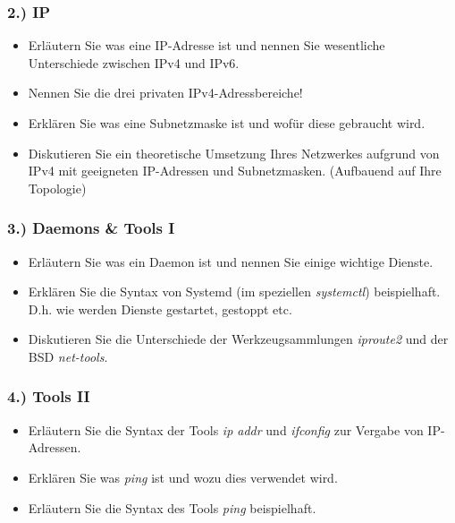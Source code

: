 \documentclass[xcolor=dvipsnames, aspectratio=169]{beamer}
\begin{document}
\begin{frame}
\frametitle{2.) IP}
	\begin{itemize}
		\item Erläutern Sie was eine IP-Adresse ist und nennen Sie wesentliche Unterschiede zwischen IPv4 und IPv6.
		\item Nennen Sie die drei privaten IPv4-Adressbereiche!
		\item Erklären Sie was eine Subnetzmaske ist und wofür diese gebraucht wird. 
		\item Diskutieren Sie ein theoretische Umsetzung Ihres Netzwerkes aufgrund von IPv4 mit geeigneten IP-Adressen und Subnetzmasken. (Aufbauend auf Ihre Topologie)
	\end{itemize}
\end{frame}

\begin{frame}
\frametitle{3.) Daemons \& Tools I}
	\begin{itemize}
		\item Erläutern Sie was ein Daemon ist und nennen Sie einige wichtige Dienste.
		\item Erklären Sie die Syntax von Systemd (im speziellen \emph{systemctl}) beispielhaft. D.h. wie werden Dienste gestartet, gestoppt etc.
		\item Diskutieren Sie die Unterschiede der Werkzeugsammlungen \emph{iproute2} und der BSD \emph{net-tools}.
	\end{itemize}
\end{frame}

\begin{frame}
\frametitle{4.) Tools II}
	\begin{itemize}
		\item Erläutern Sie die Syntax der Tools \emph{ip addr} und \emph{ifconfig} zur Vergabe von IP-Adressen.
		\item Erklären Sie was \emph{ping} ist und wozu dies verwendet wird.
		\item Erläutern Sie die Syntax des Tools \emph{ping} beispielhaft.
	\end{itemize}
\end{frame}
\end{document}
